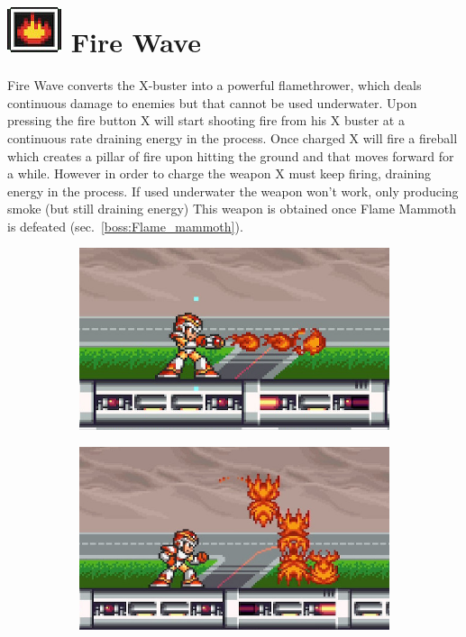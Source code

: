 \section{\includegraphics[scale=0.2]{figures/X1/weapons/F_wave.jpg} Fire Wave}\label{Fire_wave}
Fire Wave converts the X-buster into a powerful flamethrower, which deals continuous damage to enemies but that cannot be used underwater. Upon pressing the fire button X will start shooting fire from his X buster at a continuous rate draining energy in the process. Once charged X will fire a fireball which creates a pillar of fire upon hitting the ground and that moves forward for a while. However in order to charge the weapon X must keep firing, draining energy in the process. If used underwater the weapon won't work, only producing smoke (but still draining energy)  This weapon is obtained once Flame Mammoth is defeated (sec.~\ref{boss:Flame_mammoth}). 
\begin{figure}[htp]
	\centering
	\begin{subfigure}{0.35\linewidth}
		\centering
		\includegraphics[width=\linewidth]{figures/X1/weapons/Fire_wave_1.jpg}
	\end{subfigure}
	\begin{subfigure}{0.35\linewidth}
		\centering
		\includegraphics[width=\linewidth]{figures/X1/weapons/Fire_wave_3.jpg}
	\end{subfigure}
\end{figure}
